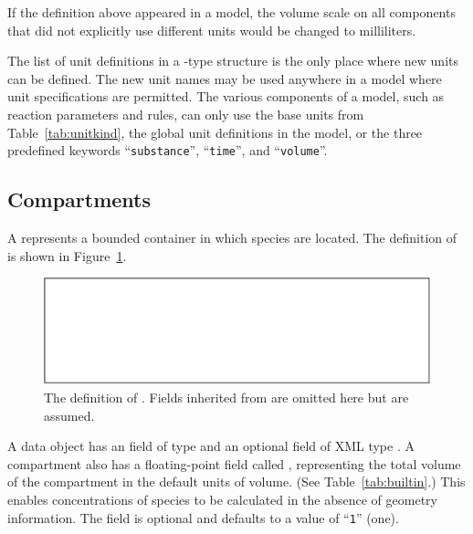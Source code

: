 \documentclass[10pt]{cekarticle}
\newcommand{\vref}[1]{\ref{#1}}
\begin{document}
If the definition above appeared in a model, the volume scale on all
components that did not explicitly use different units would be changed to
milliliters.

The list of unit definitions in a -type structure is the only
place where new units can be defined.  The new unit names may be used
anywhere in a model where unit specifications are permitted.  The various
components of a model, such as reaction parameters and rules, can only use
the base units from Table~\ref{tab:unitkind}, the global unit definitions
in the model, or the three predefined keywords ``\texttt{substance}'',
``\texttt{time}'', and ``\texttt{volume}''.

\subsection{Compartments}
\label{sec:compartments}

A  represents a bounded container in which
species are located.  The definition of  is
shown in Figure~\vref{fig:compartment}.

\begin{figure}[htb]
  \vspace*{8pt}
  \centering
  \includegraphics[scale = 0.68]{compartment}
  \caption{The definition of .
    Fields inherited from  are omitted here but are assumed.}
  \label{fig:compartment}
\end{figure}

A  data object has an  field of type
 and an optional  field of XML type
. A compartment also has a floating-point field
called , representing the total volume of the
compartment in the default units of volume. (See
Table~\vref{tab:builtin}.) This enables concentrations of species
to be calculated in the absence of geometry information. The
 field is optional and defaults to a value of
``\texttt{1}'' (one).
\end{document}
